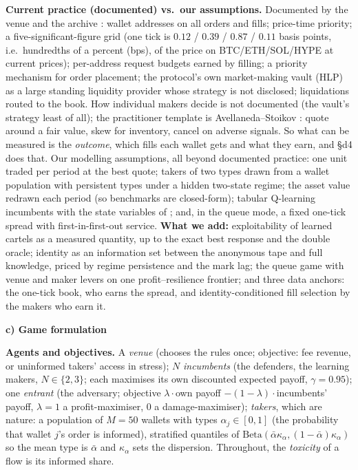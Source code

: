 \documentclass[10pt]{article}
\newcommand{\sect}[1]{\par\vspace{5pt}\noindent\textbf{#1}\par\vspace{1.5pt}\noindent}
\begin{document}
\textbf{Current practice (documented) vs.\ our assumptions.} Documented by the venue \cite{hldocs} and the archive \cite{albers}: wallet addresses on all orders and fills; price-time priority; a five-significant-figure grid (one tick is $0.12$ / $0.39$ / $0.87$ / $0.11$ basis points, i.e.\ hundredths of a percent (bps), of the price on BTC/ETH/SOL/HYPE at current prices); per-address request budgets earned by filling; a priority mechanism for order placement; the protocol's own market-making vault (HLP) as a large standing liquidity provider whose strategy is not disclosed; liquidations routed to the book. How individual makers decide is not documented (the vault's strategy least of all); the practitioner template is Avellaneda--Stoikov \cite{as}: quote around a fair value, skew for inventory, cancel on adverse signals. So what can be measured is the \emph{outcome}, which fills each wallet gets and what they earn, and \S d4 does that. Our modelling assumptions, all beyond documented practice: one unit traded per period at the best quote; takers of two types drawn from a wallet population with persistent types under a hidden two-state regime; the asset value redrawn each period (so benchmarks are closed-form); tabular Q-learning incumbents with the state variables of \cite{cfl}; and, in the queue mode, a fixed one-tick spread with first-in-first-out service. \textbf{What we add:} exploitability of learned cartels as a measured quantity, up to the exact best response and the double oracle; identity as an information set between the anonymous tape and full knowledge, priced by regime persistence and the mark lag; the queue game with venue and maker levers on one profit--resilience frontier; and three data anchors: the one-tick book, who earns the spread, and identity-conditioned fill selection by the makers who earn it.

\sect{c) Game formulation}
\textbf{Agents and objectives.} A \emph{venue} (chooses the rules once; objective: fee revenue, or uninformed takers' access in stress); $N$ \emph{incumbents} (the defenders, the learning makers, $N\in\{2,3\}$; each maximises its own discounted expected payoff, $\gamma=0.95$); one \emph{entrant} (the adversary; objective $\lambda\cdot$own payoff $-(1-\lambda)\cdot$incumbents' payoff, $\lambda=1$ a profit-maximiser, $0$ a damage-maximiser); \emph{takers}, which are nature: a population of $M=50$ wallets with types $\alpha_j\in[0,1]$ (the probability that wallet $j$'s order is informed), stratified quantiles of $\mathrm{Beta}(\bar\alpha\kappa_\alpha,(1-\bar\alpha)\kappa_\alpha)$ so the mean type is $\bar\alpha$ and $\kappa_\alpha$ sets the dispersion. Throughout, the \emph{toxicity} of a flow is its informed share.
\end{document}
